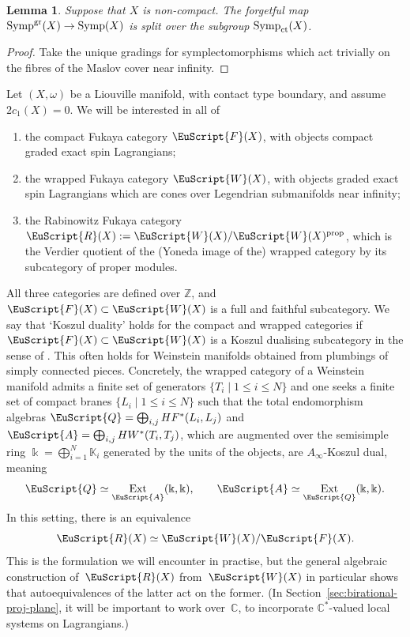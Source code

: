 \documentclass[10pt,a4paper]{amsart}
\DeclareMathOperator{\Ext}{Ext}
\def\scrA{\EuScript{A}}
\def\scrQ{\EuScript{Q}}
\def\scrR{\EuScript{R}}
\newcommand{\scrF}{\EuScript{F}}
\def\scrW{\EuScript{W}}
\DeclareMathOperator{\Symp}{Symp}
\def\bK{\mathbb{K}}
\def\bZ{\mathbb{Z}}
\def\bC{\mathbb{C}}
\newtheorem{lem}[thm]{Lemma}
\theoremstyle{definition}
\numberwithin{equation}{section}
\begin{document}
\begin{lem}\label{lem:forgetting-gradings-splits}
Suppose that $X$ is non-compact. The forgetful map $\Symp^{\rm gr}(X) \to \Symp(X)$ is split over the subgroup $\Symp_{\rm ct}(X)$.
\end{lem}

\begin{proof} Take the unique gradings for symplectomorphisms which act trivially on the fibres of the Maslov cover near infinity.
\end{proof}

Let $(X,\omega)$ be a Liouville manifold, with contact type boundary, and assume $2c_1(X)=0$. We will be interested in all of
\begin{enumerate}\itemsep=0pt
\item[(1)] the compact Fukaya category $\scrF(X)$, with objects compact graded exact spin Lagrangians;
\item[(2)] the wrapped Fukaya category $\scrW(X)$, with objects graded exact spin Lagrangians which are cones over Legendrian submanifolds near infinity;
\item[(3)] the Rabinowitz Fukaya category $\scrR(X) := \scrW(X) / \scrW(X)^{\rm prop}$, which is the Verdier quotient of the (Yoneda image of the) wrapped category by its subcategory of proper modules.
\end{enumerate}

All three categories are defined over $\bZ$, and $\scrF(X) \subset \scrW(X)$ is a full and faithful subcategory. We say that `Koszul duality' holds for the compact and wrapped categories if $\scrF(X) \subset \scrW(X)$ is a Koszul dualising subcategory in the sense of \cite[Definition~2.12]{GGV}. This often holds for Weinstein manifolds obtained from plumbings of simply connected pieces. Concretely, the wrapped category of a Weinstein manifold admits a finite set of generators $\{T_i \mid 1 \leq i \leq N\}$ and one seeks a finite set of compact branes $\{L_i \mid 1 \leq i \leq N\}$ such that the total endomorphism algebras $\scrQ = \bigoplus_{i,j} HF^*(L_i,L_j)$ and $\scrA = \bigoplus_{i,j} HW^*(T_i,T_j)$, which are augmented over the semisimple ring $\Bbbk = \bigoplus_{i=1}^N \bK_i$ generated by the units of the objects, are $A_{\infty}$-Koszul dual, meaning
\[
\scrQ \simeq \Ext_{\scrA}(\Bbbk,\Bbbk), \qquad \scrA \simeq \Ext_{\scrQ}(\Bbbk,\Bbbk).
\]
In this setting, there is an equivalence \cite[Corollary~1.4]{GGV}
\[
\scrR(X) \simeq \scrW(X) / \scrF(X).
\]
This is the formulation we will encounter in practise, but the general algebraic construction of~$\scrR(X)$ from~$\scrW(X)$ in particular shows that autoequivalences of the latter act on the former.
 (In Section~\ref{sec:birational-proj-plane}, it will be important to work over~$\bC$, to incorporate $\bC^*$-valued local systems on Lagrangians.)
\end{document}
